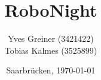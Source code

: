 \begin{titlepage}

	\titlehead
	{
		\texttt{[image: images/logos/htw.jpg]}		
		\hfill
		\texttt{[image: images/logos/mindstorms.jpg]}		
	}
	
	\subject
	{
		\Huge Dokumentation
	}
	
	\title
	{
		RoboNight
	}
	
	\author
	{	
		Yves Greiner (3421422)\\
		Tobias Kalmes (3525899)
	}
	
	\date
	{
		\normalsize{Saarbrücken, \today}
	}	
	\maketitle	
\end{titlepage}
